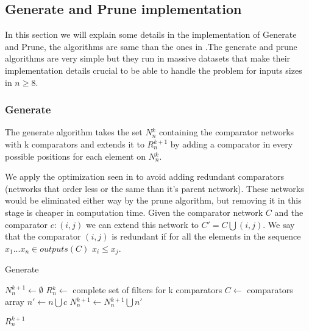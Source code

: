 \documentclass[../main.tex]{subfiles}
\begin{document}
	\subsection{Generate and Prune implementation}
	In this section we will explain some details in the implementation of Generate and Prune, the algorithms are same than the ones in \cite{sortingnineinputs}.The generate and prune algorithms are very simple but they run in massive datasets that make their implementation details crucial to be able to handle the problem for inputs sizes in $n \geq 8$.
	
	\subsubsection{Generate}
	The generate algorithm takes the set $N{_n^k}$ containing the comparator networks with k comparators and extends it to $R{_n^{k+1}}$ by adding a comparator in every possible positions for each element on $N{_n^k}$.
	
	We apply the optimization seen in \cite{sortingnineinputs} to avoid adding redundant comparators (networks that order less or the same than it's parent network). These networks would be eliminated either way by the prune algorithm, but removing it in this stage is cheaper in computation time. Given the comparator network $C$ and the comparator $c:(i,j)$ we can extend this network to $C' = C \bigcup (i,j)$. We say that the comparator $(i,j)$ is redundant if for all the elements in the sequence $x_1...x_n  \in outputs(C)$ $x_i \leq x_j$.
	
	\begin{algorithm}[H]
	\caption{Generate} 
	\begin{algorithmic}
	\State $N{_n^{k+1}} \leftarrow \emptyset$
	\State $R{_n^k} \leftarrow$ complete set of filters for k comparators
	\State $C \leftarrow$ comparators array
			\State $n' \leftarrow n\bigcup c$
			\State $N{_n^{k+1}} \leftarrow N{_n^{k+1}} \bigcup n'$
			\EndIf
		\EndFor
	\EndFor
	
	\Return $R{_n^{k+1}}$
	\end{algorithmic}
	\end{algorithm}
\end{document}
